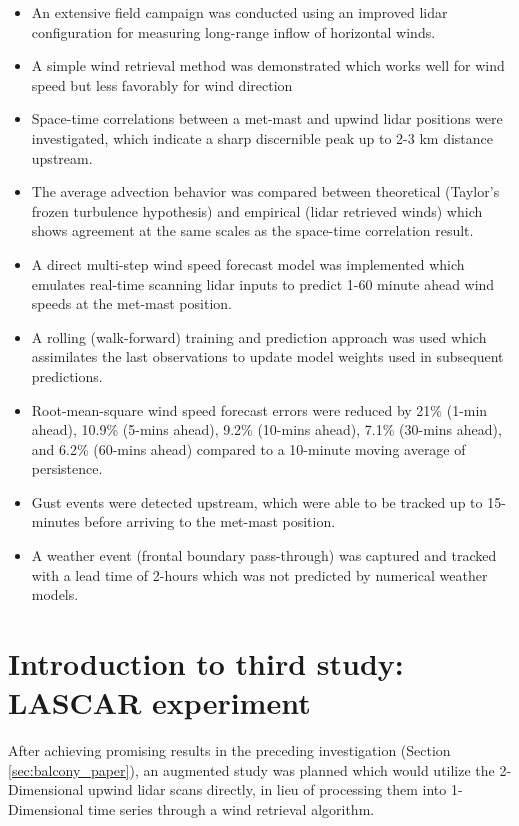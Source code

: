 \begin{itemize}
    \item An extensive field campaign was conducted using an improved lidar configuration for measuring long-range inflow of horizontal winds.
    \item A simple wind retrieval method was demonstrated which works well for wind speed but less favorably for wind direction
    \item Space-time correlations between a met-mast and upwind lidar positions were investigated, which indicate a sharp discernible peak up to 2-3 km distance upstream.
    \item The average advection behavior was compared between theoretical (Taylor's frozen turbulence hypothesis) and empirical (lidar retrieved winds) which shows agreement at the same scales as the space-time correlation result.
    \item A direct multi-step wind speed forecast model was implemented which emulates real-time scanning lidar inputs to predict 1-60 minute ahead wind speeds at the met-mast position.
    \item A rolling (walk-forward) training and prediction approach was used which assimilates the last observations to update model weights used in subsequent predictions.
    \item Root-mean-square wind speed forecast errors were reduced by 21\% (1-min ahead), 10.9\% (5-mins ahead), 9.2\% (10-mins ahead), 7.1\% (30-mins ahead), and 6.2\% (60-mins ahead) compared to a 10-minute moving average of persistence.
    \item Gust events were detected upstream, which were able to be tracked up to 15-minutes before arriving to the met-mast position.
    \item A weather event (frontal boundary pass-through) was captured and tracked with a lead time of 2-hours which was not predicted by numerical weather models.
    
\end{itemize}

\clearpage
\section{Introduction to third study: LASCAR experiment}
\label{sec:lascar_intro}

After achieving promising results in the preceding investigation (Section \ref{sec:balcony_paper}), an augmented study was planned which would utilize the 2-Dimensional upwind lidar scans directly, in lieu of processing them into 1-Dimensional time series through a wind retrieval algorithm.

